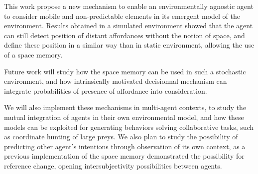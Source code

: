 \documentclass[conference]{IEEEtran}
\begin{document}
This work propose a new mechanism to enable an environmentally agnostic agent to consider mobile and non-predictable elements in its emergent model of the environment. Results obtained in a simulated environment showed that the agent can still detect position of distant affordances without the notion of space, and define these position in a similar way than in static environment, allowing the use of a space memory.

Future work will study how the space memory can be used in such a stochastic environment, and how intrinsically motivated decisionnal mechanism can integrate probabilities of presence of affordance into consideration.

We will also implement these mechanisms in multi-agent contexts, to study the mutual integration of agents in their own environmental model, and how these models can be exploited for generating behaviors solving collaborative tasks, such as coordinate hunting of large preys. We also plan to study the possibility of predicting other agent's intentions through observation of its own context, as a previous implementation of the space memory demonstrated the possibility for reference change, opening intersubjectivity possibilities between agents.

\end{document}
